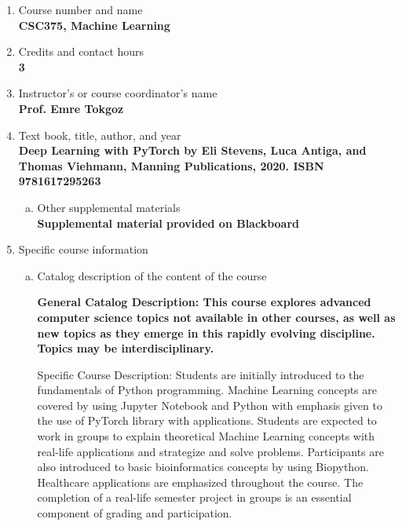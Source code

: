 \label{CSC375-ML}  %
\begin{enumerate}[1.]
\item Course number and name\\
  {\bfseries
    CSC375, Machine Learning
  }

\item Credits and contact hours\\
  {\bfseries
    3
  }

\item Instructor's or course coordinator's name\\
  {\bfseries
    Prof. Emre Tokgoz
  }

\item Text book, title, author, and year\\
  {\bfseries
    Deep Learning with PyTorch by Eli Stevens, Luca Antiga, and Thomas Viehmann, Manning Publications, 2020. ISBN 9781617295263
  }
\begin{enumerate}[a.]
\item Other supplemental materials\\
  {\bfseries
    Supplemental material provided on Blackboard
  }
\end{enumerate}

\item Specific course information
\begin{enumerate}[a.]
\item Catalog description of the content of the course\\
  {\bfseries
General Catalog Description: This course explores advanced computer science topics not available in other courses, as well as new topics as they emerge in this rapidly evolving discipline. Topics may be interdisciplinary.

Specific Course Description: Students are initially introduced to the fundamentals of Python programming. Machine Learning concepts
are covered by using Jupyter Notebook and Python with emphasis given to the use of PyTorch library with applications.
Students are expected to work in groups to explain theoretical Machine Learning concepts with real-life applications and
strategize and solve problems. Participants are also introduced to basic bioinformatics concepts by using Biopython. Healthcare
applications are emphasized throughout the course. The completion of a real-life semester project in groups is an essential
component of grading and participation.
  }


\end{enumerate}
\end{enumerate}
